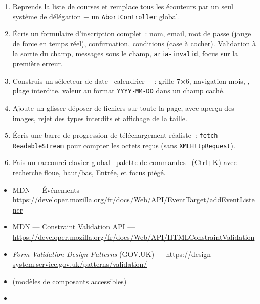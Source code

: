 \begin{exercice}
\begin{enumerate}
  \item Reprends la liste de courses et remplace tous les \'ecouteurs par un seul syst\`eme de
        d\'el\'egation + un \verb|AbortController| global.
  \item \'Ecris un formulaire d'inscription complet~: nom, email, mot de passe (jauge de force
        en temps r\'eel), confirmation, conditions (case \`a cocher). Validation \`a la sortie du champ,
        messages sous le champ, \verb|aria-invalid|, focus sur la premi\`ere erreur.
  \item Construis un s\'electeur de date \og ~calendrier~ \fg{}~: grille 7$\times$6, navigation mois,
         , plage interdite, valeur au format \verb|YYYY-MM-DD| dans un champ cach\'e.
  \item Ajoute un glisser-d\'eposer de fichiers sur toute la page, avec aper\c{c}u des images,
        rejet des types interdits et affichage de la taille.
  \item \'Ecris une barre de progression de t\'el\'echargement r\'ealiste~: \verb|fetch| +
        \verb|ReadableStream| pour compter les octets re\c{c}us (sans \verb|XMLHttpRequest|).
  \item Fais un raccourci clavier global \og ~palette de commandes~ \fg{} (Ctrl+K) avec recherche
        floue, haut/bas, Entr\'ee, et focus pi\'eg\'e.
\end{enumerate}
\end{exercice}

\begin{ressources}
\begin{itemize}
  \item MDN --- \'Ev\'enements --- \url{https://developer.mozilla.org/fr/docs/Web/API/EventTarget/addEventListener}
  \item MDN --- Constraint Validation API --- \url{https://developer.mozilla.org/fr/docs/Web/API/HTMLConstraintValidation}
  \item \emph{Form Validation Design Patterns} (GOV.UK) --- \url{https://design-system.service.gov.uk/patterns/validation/}
  \item {} (mod\`eles de composants accessibles)
  \item {}
\end{itemize}
\end{ressources}

